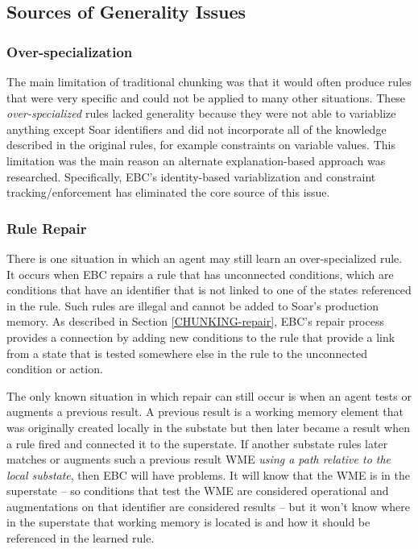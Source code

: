 \subsection{Sources of Generality Issues}

\subsubsection{Over-specialization}

The main limitation of traditional chunking was that it would often produce rules that were very specific and could not be applied to many other situations. These \textit{over-specialized} rules lacked generality because they were not able to variablize anything except Soar identifiers and did not incorporate all of the knowledge described in the original rules, for example constraints on variable values.  This limitation was the main reason an alternate explanation-based approach was researched.  Specifically, EBC's identity-based variablization and constraint tracking/enforcement has eliminated the core source of this issue.

\subsubsection{Rule Repair}

There is one situation in which an agent may still learn an over-specialized rule.  It occurs when EBC repairs a rule that has unconnected conditions, which are conditions that have an identifier that is not linked to one of the states referenced in the rule.  Such rules are illegal and cannot be added to Soar's production memory. As described in Section \ref{CHUNKING-repair}, EBC's repair process provides a connection by adding new conditions to the rule that provide a link from a state that is tested somewhere else in the rule to the unconnected condition or action. 

The only known situation in which repair can still occur is when an agent tests or augments a previous result.  A previous result is a working memory element that was originally created locally in the substate but then later became a result when a rule fired and connected it to the superstate.  If another substate rules later matches or augments such a previous result WME \emph{using a path relative to the local substate}, then EBC will have problems.  It will know that the WME is in the superstate -- so conditions that test the WME are considered operational and augmentations on that identifier are considered results -- but it won't know where in the superstate that working memory is located is and how it should be referenced in the learned rule. 

